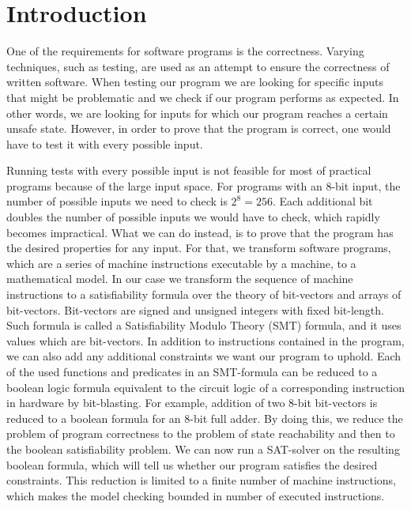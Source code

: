 \documentclass[12pt]{article}
\begin{document}

\newpage
\tableofcontents
\newpage


\section{Introduction}

One of the requirements for software programs is the correctness. Varying
techniques, such as testing, are used as an attempt to ensure the correctness
of written software. When testing our program we are looking for specific
inputs that might be problematic and we check if our program performs as
expected. In other words, we are looking for inputs for which our program
reaches a certain unsafe state. However, in order to prove that the program is
correct, one would have to test it with every possible input.

Running tests with every possible input is not feasible for most of practical
programs because of the large input space. For programs with an 8-bit input,
the number of possible inputs we need to check is $2^8 = 256$. Each additional
bit doubles the number of possible inputs we would have to check, which rapidly
becomes impractical. What we can do instead, is to prove that the program has
the desired properties for any input. For that, we transform software programs,
which are a series of machine instructions executable by a machine, to a
mathematical model. In our case we transform the sequence of machine
instructions to a satisfiability formula over the theory of bit-vectors and
arrays of bit-vectors. Bit-vectors are signed and unsigned integers with fixed
bit-length. Such formula is called a Satisfiability Modulo Theory (SMT)
formula, and it uses values which are bit-vectors. In addition to instructions
contained in the program, we can also add any additional constraints we want
our program to uphold. Each of the used functions and predicates in an
SMT-formula can be reduced to a boolean logic formula equivalent to the circuit
logic of a corresponding instruction in hardware by bit-blasting. For example, 
addition of two 8-bit bit-vectors is reduced to a boolean formula for an 8-bit
full adder. By doing this, we reduce the problem of program correctness to the
problem of state reachability and then to the boolean satisfiability problem.
We can now run a SAT-solver on the resulting boolean formula, which will tell
us whether our program satisfies the desired constraints. This reduction is
limited to a finite number of machine instructions, which makes the model
checking bounded in number of executed instructions.
\end{document}
